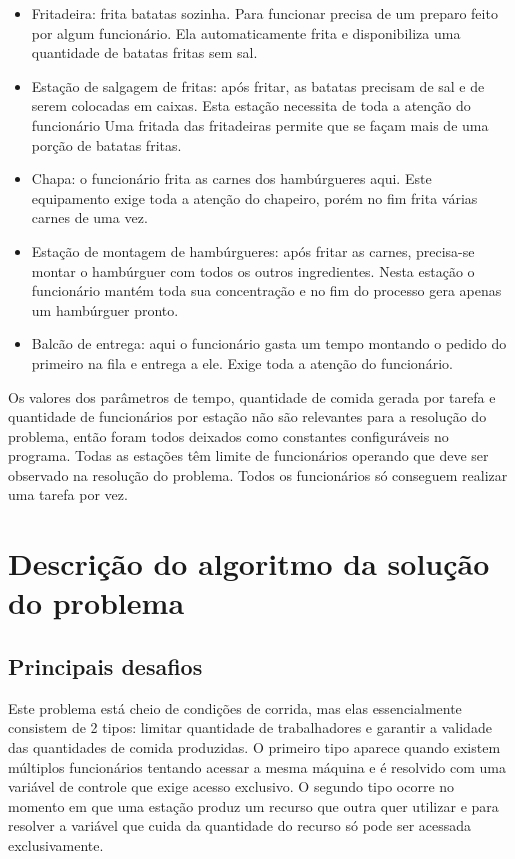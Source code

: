 \documentclass[a4paper]{article}
\begin{document}
\begin{itemize}
	\item Fritadeira: frita batatas sozinha. Para funcionar precisa de um preparo feito por algum funcionário. Ela automaticamente frita e disponibiliza uma quantidade de batatas fritas sem sal.

	\item Estação de salgagem de fritas: após fritar, as batatas precisam de sal e de serem colocadas em caixas. Esta estação necessita de toda a atenção do funcionário Uma fritada das fritadeiras permite que se façam mais de uma porção de batatas fritas.

	\item Chapa: o funcionário frita as carnes dos hambúrgueres aqui. Este equipamento exige toda a atenção do chapeiro, porém no fim frita várias carnes de uma vez.

	\item Estação de montagem de hambúrgueres: após fritar as carnes, precisa-se montar o hambúrguer com todos os outros ingredientes. Nesta estação o funcionário mantém toda sua concentração e no fim do processo gera apenas um hambúrguer pronto.

	\item Balcão de entrega: aqui o funcionário gasta um tempo montando o pedido do primeiro na fila e entrega a ele. Exige toda a atenção do funcionário.
\end{itemize}


Os valores dos parâmetros de tempo, quantidade de comida gerada por tarefa e quantidade de funcionários por estação não são relevantes para a resolução do problema, então foram todos deixados como constantes configuráveis no programa. Todas as estações têm limite de funcionários operando que deve ser observado na resolução do problema. Todos os funcionários só conseguem realizar uma tarefa por vez.

\section{Descrição do algoritmo da solução do problema}

\subsection{Principais desafios}

Este problema está cheio de condições de corrida, mas elas essencialmente consistem de 2 tipos: limitar quantidade de trabalhadores e garantir a validade das quantidades de comida produzidas. O primeiro tipo aparece quando existem múltiplos funcionários tentando acessar a mesma máquina e é resolvido com uma variável de controle que exige acesso exclusivo. O segundo tipo ocorre no momento em que uma estação produz um recurso que outra quer utilizar e para resolver a variável que cuida da quantidade do recurso só pode ser acessada exclusivamente.
\end{document}
